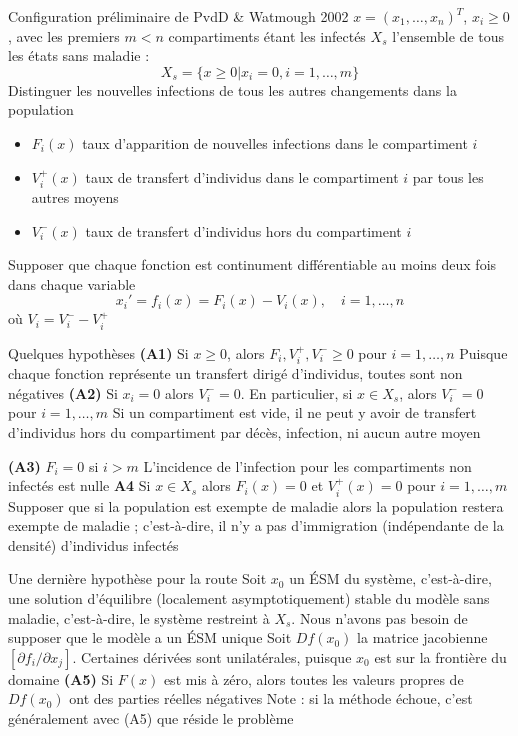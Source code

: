 \documentclass[aspectratio=169]{beamer}\usepackage[]{graphicx}\usepackage[]{xcolor}
\begin{document}
\begin{frame}{Configuration préliminaire de PvdD \& Watmough 2002}
$x=(x_1,\ldots,x_n)^T$, $x_i\geq 0$, avec les premiers $m<n$ compartiments étant les infectés
\vfill
$X_s$ l'ensemble de tous les états sans maladie : 
\[
X_s=\{x\geq 0| x_i=0, i=1,\ldots,m\}
\]
\vfill
Distinguer les nouvelles infections de tous les autres changements dans la population
\begin{itemize}
\item $F_i(x)$ taux d'apparition de nouvelles infections dans le compartiment $i$
\item $V_i^+(x)$ taux de transfert d'individus dans le compartiment $i$ par tous les autres moyens
\item $V_i^-(x)$ taux de transfert d'individus hors du compartiment $i$
\end{itemize}
\vfill
Supposer que chaque fonction est continument différentiable au moins deux fois dans chaque variable
\vfill
\[
x_i' = f_i(x)=F_i(x)-V_i(x),\quad i=1,\ldots,n
\]
où $V_i=V_i^--V_i^+$
\end{frame}

\begin{frame}{Quelques hypothèses}
\bbullet\textbf{(A1)}
Si $x\geq 0$, alors $F_i,V_i^+,V_i^-\geq 0$ pour $i=1,\ldots,n$
\vfill
Puisque chaque fonction représente un transfert dirigé d'individus, toutes sont non négatives
\vfill
\bbullet\textbf{(A2)} 
Si $x_i=0$ alors $V_i^-=0$. En particulier, si $x\in X_s$, alors $V_i^-=0$ pour $i=1,\ldots,m$
\vfill
Si un compartiment est vide, il ne peut y avoir de transfert d'individus hors du compartiment par décès, infection, ni aucun autre moyen
\end{frame}

\begin{frame}
\bbullet \textbf{(A3)} $F_i=0$ si $i>m$
\vfill
L'incidence de l'infection pour les compartiments non infectés est nulle
\vfill
\bbullet \textbf{A4} Si $x\in X_s$ alors $F_i(x)=0$ et $V_i^+(x)=0$ pour $i=1,\ldots,m$
\vfill
Supposer que si la population est exempte de maladie alors la population restera exempte de maladie ; c'est-à-dire, il n'y a pas d'immigration (indépendante de la densité) d'individus infectés
\end{frame}

\begin{frame}{Une dernière hypothèse pour la route}
Soit $x_0$ un ÉSM du système, c'est-à-dire, une solution d'équilibre (localement asymptotiquement) stable du modèle sans maladie, c'est-à-dire, le système restreint à $X_s$. Nous n'avons pas besoin de supposer que le modèle a un ÉSM unique
\vfill
Soit $Df(x_0)$ la matrice jacobienne $[\partial f_i/\partial x_j]$. Certaines dérivées sont unilatérales, puisque $x_0$ est sur la frontière du domaine
\vfill
\textbf{(A5)} Si $F(x)$ est mis à zéro, alors toutes les valeurs propres de $Df(x_0)$ ont des parties réelles négatives
\vfill
Note : si la méthode échoue, c'est généralement avec (A5) que réside le problème
\end{frame}
\end{document}
